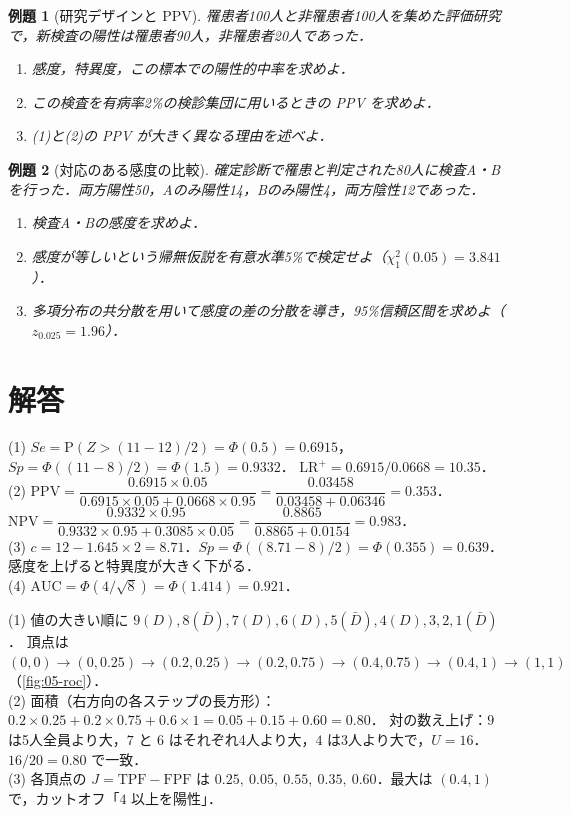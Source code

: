 \documentclass[a4paper,11pt,openany]{ltjsbook}
\newtheorem{reidai}{例題}[chapter]
\newenvironment{kaitou}[1]{%
  \par\medskip\noindent
  \begin{tcolorbox}[enhanced,breakable,colback=bkgray!3,colframe=bkgray!60,boxrule=0.4pt,
    left=4pt,right=4pt,top=2pt,bottom=2pt,arc=1pt,
    title={\cref{#1}の解答},fonttitle=\bfseries\small,coltitle=white,colbacktitle=bkgray!80]}%
  {\end{tcolorbox}\par}
\newcommand{\Prob}{\mathrm{P}}
\begin{document}
\begin{reidai}[研究デザインと PPV]\label{reidai:05-3}
罹患者100人と非罹患者100人を集めた評価研究で，新検査の陽性は罹患者90人，非罹患者20人であった．
\begin{enumerate}[label=(\arabic*)]
\item 感度，特異度，この標本での陽性的中率を求めよ．
\item この検査を有病率2\%の検診集団に用いるときの PPV を求めよ．
\item (1)と(2)の PPV が大きく異なる理由を述べよ．
\end{enumerate}
\end{reidai}

\begin{reidai}[対応のある感度の比較]\label{reidai:05-4}
確定診断で罹患と判定された80人に検査A・Bを行った．両方陽性50，Aのみ陽性14，Bのみ陽性4，両方陰性12であった．
\begin{enumerate}[label=(\arabic*)]
\item 検査A・Bの感度を求めよ．
\item 感度が等しいという帰無仮説を有意水準5\%で検定せよ（$\chi^2_1(0.05)=3.841$）．
\item 多項分布の共分散を用いて感度の差の分散を導き，95\%信頼区間を求めよ（$z_{0.025}=1.96$）．
\end{enumerate}
\end{reidai}

\section{解答}\label{sec:05-sol}
\begin{kaitou}{reidai:05-1}
(1) $Se=\Prob(Z>(11-12)/2)=\Phi(0.5)=0.6915$，$Sp=\Phi((11-8)/2)=\Phi(1.5)=0.9332$．
$\mathrm{LR}^+=0.6915/0.0668=10.35$．\\
(2) $\mathrm{PPV}=\dfrac{0.6915\times0.05}{0.6915\times0.05+0.0668\times0.95}=\dfrac{0.03458}{0.03458+0.06346}=0.353$．
$\mathrm{NPV}=\dfrac{0.9332\times0.95}{0.9332\times0.95+0.3085\times0.05}=\dfrac{0.8865}{0.8865+0.0154}=0.983$．\\
(3) $c=12-1.645\times2=8.71$．$Sp=\Phi((8.71-8)/2)=\Phi(0.355)=0.639$．感度を上げると特異度が大きく下がる．\\
(4) $\mathrm{AUC}=\Phi(4/\sqrt{8})=\Phi(1.414)=0.921$．
\end{kaitou}

\begin{kaitou}{reidai:05-2}
(1) 値の大きい順に $9(D),8(\bar D),7(D),6(D),5(\bar D),4(D),3,2,1(\bar D)$．
頂点は $(0,0)\to(0,0.25)\to(0.2,0.25)\to(0.2,0.75)\to(0.4,0.75)\to(0.4,1)\to(1,1)$（\cref{fig:05-roc}）．\\
(2) 面積（右方向の各ステップの長方形）：$0.2\times0.25+0.2\times0.75+0.6\times1=0.05+0.15+0.60=0.80$．
対の数え上げ：$9$ は5人全員より大，$7$ と $6$ はそれぞれ4人より大，$4$ は3人より大で，$U=16$．$16/20=0.80$ で一致．\\
(3) 各頂点の $J=\mathrm{TPF}-\mathrm{FPF}$ は $0.25,\ 0.05,\ 0.55,\ 0.35,\ 0.60$．最大は $(0.4,1)$ で，カットオフ「$4$ 以上を陽性」．
\end{kaitou}
\end{document}
